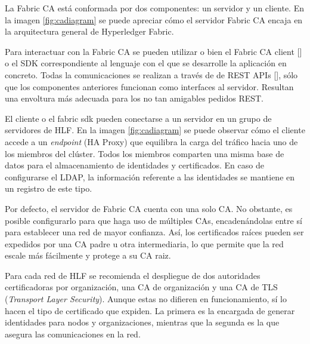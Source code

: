 La Fabric CA est\'a conformada por dos componentes: un servidor y un cliente. En la imagen \ref{fig:cadiagram} se puede apreciar c\'omo el servidor Fabric CA encaja en la arquitectura general de Hyperledger Fabric.


Para interactuar con la Fabric CA se pueden utilizar o bien el Fabric CA client [\cite{caclient}] o el SDK correspondiente al lenguaje con el que se desarrolle la aplicaci\'on en concreto. Todas la comunicaciones se realizan a trav\'es de de REST APIs [\cite{restapifaclient}], s\'olo que los componentes anteriores funcionan como interfaces al servidor. Resultan una envoltura m\'as adecuada para los no tan amigables pedidos REST.

El cliente o el fabric sdk pueden conectarse a un servidor en un grupo de servidores de HLF. En la imagen \ref{fig:cadiagram} se puede observar c\'omo el cliente accede a un \emph{endpoint} (HA Proxy) que equilibra la carga del tr\'afico hacia uno de los miembros del cl\'uster. Todos los miembros comparten una misma base de datos para el almacenamiento de identidades y certificados. En caso de configurarse el LDAP, la informaci\'on referente a las identidades se mantiene en un registro de este tipo.

Por defecto, el servidor de Fabric CA cuenta con una solo CA. No obstante, es posible configurarlo para que haga uso de m\'ultiples CAs, encaden\'andolas entre s\'i para establecer una red de mayor confianza. As\'i, los certificados ra\'ices pueden ser expedidos por una CA padre u otra intermediaria, lo que permite que la red escale m\'as f\'acilmente y protege a su CA raiz.%

Para cada red de HLF se recomienda el despliegue de dos autoridades certificadoras por organizaci\'on, una CA de organizaci\'on y una CA de TLS (\emph{Transport Layer Security}). Aunque estas no difieren en funcionamiento, s\'i lo hacen el tipo de certificado que expiden. La primera es la encargada de generar identidades para nodos y organizaciones, mientras que la segunda es la que asegura las comunicaciones en la red.

